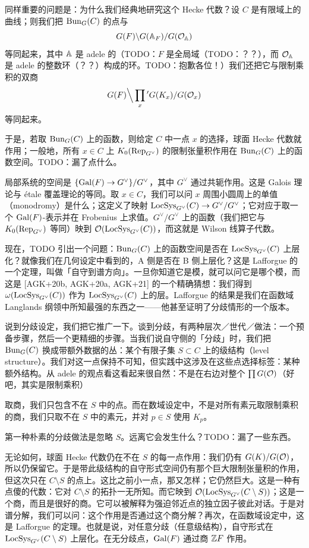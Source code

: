 同样重要的问题是：为什么我们经典地研究这个 Hecke 代数？设 $C$ 是有限域上的曲线；则我们把 $\mathrm{Bun}_G(C)$ 的点与
\[
G(F)\backslash G(\mathbb{A}_F)/G(\mathcal{O}_{\mathbb{A}})
\]
等同起来，其中 $\mathbb{A}$ 是 adele 的（TODO：$F$ 是全局域（TODO：？？），而 $\mathcal{O}_{\mathbb{A}}$ 是 adele 的整数环（？？）构成的环。TODO：抱歉各位！）我们还把它与限制乘积的双商
\[
G(F)\Big\backslash\prod_x{}' G(K_x)/G(\mathcal{O}_x)
\]
等同起来。

于是，若取 $\mathrm{Bun}_G(C)$ 上的函数，则给定 $C$ 中一点 $x$ 的选择，球面 Hecke 代数就作用；一般地，所有 $x\in C$ 上 $K_0(\operatorname{Rep}_{G^\vee})$ 的限制张量积作用在 $\mathrm{Bun}_G(C)$ 上的函数空间。TODO：漏了点什么。

局部系统的空间是 $\{\operatorname{Gal}(F)\to G^\vee\}/G^\vee$，其中 $G^\vee$ 通过共轭作用。这是 Galois 理论与 étale 覆盖理论的等同。取 $x\in C$，我们可以问 $x$ 周围小圆周上的单值（monodromy）是什么；这定义了映射 $\mathrm{LocSys}_{G^\vee}(C)\to G^\vee/G^\vee$；它对应于取一个 $\operatorname{Gal}(F)$-表示并在 Frobenius 上求值。$G^\vee/G^\vee$ 上的函数（我们把它与 $K_0(\operatorname{Rep}_{G^\vee})$ 等同）映到 $\mathcal{O}(\mathrm{LocSys}_{G^\vee}(C))$，而这就是 Wilson 线算子代数。

现在，TODO 引出一个问题：$\mathrm{Bun}_G(C)$ 上的函数空间是否在 $\mathrm{LocSys}_{G^\vee}(C)$ 上层化？就像我们在几何设定中看到的，A 侧是否在 B 侧上层化？这是 Lafforgue 的一个定理，叫做「自守到谱方向」。一旦你知道它是模，就可以问它是哪个模，而这是 [AGK+20b, AGK+20a, AGK+21] 的一个精确猜想：我们得到 $\omega(\mathrm{LocSys}_{G^\vee}(C))$ 作为 $\mathrm{LocSys}_{G^\vee}(C)$ 上的层。Lafforgue 的结果是我们在函数域 Langlands 纲领中所知最强的东西之一——他甚至证明了分歧情形的一个版本。

说到分歧设定，我们把它推广一下。谈到分歧，有两种层次／世代／做法：一个预备步骤，然后一个更精细的步骤。当我们说自守侧的「分歧」时，我们把 $\mathrm{Bun}_G(C)$ 换成带额外数据的丛：某个有限子集 $S\subset C$ 上的级结构（level structure）。我们对这一点保持不可知，但实践中这涉及在这些点选择标签：某种额外结构。从 adele 的观点看这看起来很自然：不是在右边对整个 $\prod G(\mathcal{O})$（好吧，其实是限制乘积）


取商，我们只包含不在 $S$ 中的点。而在数域设定中，不是对所有素元取限制乘积的商，我们只取不在 $S$ 中的素元，并对 $p\in S$ 使用 $K_p$。

第一种朴素的分歧做法是忽略 $S$。远离它会发生什么？TODO：漏了一些东西。

无论如何，球面 Hecke 代数仍在不在 $S$ 的每一点作用：我们仍有 $G(K)/G(\mathcal{O})$，所以仍保留它。于是带此级结构的自守形式空间仍有那个巨大限制张量积的作用，但这次只在 $C\setminus S$ 的点上。这比之前小一点，那又怎样；它仍然巨大。这是一种有点傻的代数：它对 $C\setminus S$ 的拓扑一无所知。而它映到 $\mathcal{O}(\mathrm{LocSys}_{G^\vee}(C\setminus S))$；这是一个商，而且是很好的商。它可以被解释为强迫邻近点的独立因子彼此对话。于是对谱分解，我们可以问：这个作用是否通过这个商分解？再次，在函数域设定中，这是 Lafforgue 的定理。也就是说，对任意分歧（任意级结构），自守形式在 $\mathrm{LocSys}_{G^\vee}(C\setminus S)$ 上层化。在无分歧点，$\operatorname{Gal}(F)$ 通过商 $\mathbb{Z} F$ 作用。

